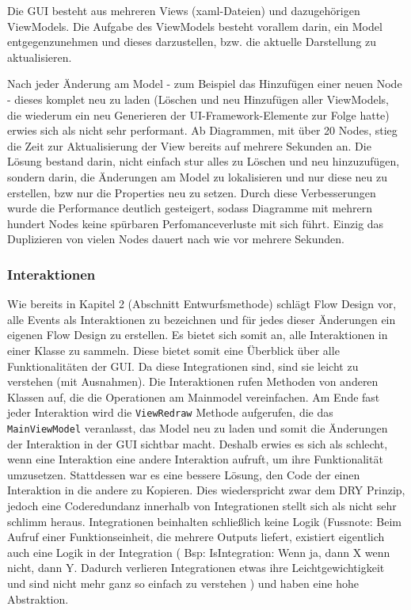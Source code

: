 Die GUI besteht aus mehreren Views (xaml-Dateien) und dazugehörigen ViewModels.
Die Aufgabe des ViewModels besteht vorallem darin, ein Model entgegenzunehmen und dieses
darzustellen, bzw. die aktuelle Darstellung zu aktualisieren.

Nach jeder Änderung am Model - zum Beispiel das Hinzufügen einer neuen
Node -  dieses komplet neu zu laden (Löschen und neu Hinzufügen aller
ViewModels, die wiederum ein neu Generieren der UI-Framework-Elemente zur
Folge hatte) erwies sich als nicht sehr performant. 
Ab Diagrammen, mit über 20 Nodes, stieg die Zeit zur Aktualisierung der View
bereits auf mehrere Sekunden an.
Die Lösung bestand darin, nicht einfach stur alles zu Löschen und neu
hinzuzufügen, sondern darin, die Änderungen am Model zu lokalisieren und nur
diese neu zu erstellen, bzw nur die Properties neu zu setzen. Durch
diese Verbesserungen wurde die Performance deutlich gesteigert, sodass
Diagramme mit mehrern hundert Nodes keine spürbaren Perfomanceverluste mit
sich führt. Einzig das Duplizieren von vielen Nodes dauert nach wie vor
mehrere Sekunden. 

\subsubsection{Interaktionen}
\label{sec:orgheadline26}
Wie bereits in Kapitel 2 (Abschnitt Entwurfsmethode) schlägt Flow Design
vor, alle Events als Interaktionen zu bezeichnen und für jedes dieser
Änderungen ein eigenen Flow Design zu erstellen. 
Es bietet sich somit an, alle Interaktionen in einer Klasse zu sammeln.
Diese bietet somit eine Überblick über alle Funktionalitäten der GUI.
Da diese Integrationen sind, sind sie leicht zu verstehen (mit Ausnahmen). Die
Interaktionen rufen Methoden von anderen Klassen auf, die die Operationen am
Mainmodel vereinfachen. Am Ende fast jeder Interaktion wird die \texttt{ViewRedraw}
Methode aufgerufen, die das \texttt{MainViewModel} veranlasst, das Model neu zu
laden und somit die Änderungen der Interaktion in der GUI sichtbar macht.
Deshalb erwies es sich als schlecht, wenn eine Interaktion eine andere
Interaktion aufruft, um ihre Funktionalität umzusetzen. 
Stattdessen war es eine bessere Lösung, den Code der einen Interaktion in
die andere zu Kopieren. Dies wiederspricht zwar dem DRY Prinzip, jedoch eine
Coderedundanz innerhalb von Integrationen stellt sich als nicht sehr schlimm
heraus. Integrationen beinhalten schließlich keine Logik (Fussnote: Beim
Aufruf einer Funktionseinheit, die mehrere Outputs liefert, existiert
eigentlich auch eine Logik in der Integration ( Bsp: IsIntegration: Wenn ja,
dann X wenn nicht, dann Y. Dadurch verlieren Integrationen etwas ihre
Leichtgewichtigkeit und sind nicht mehr ganz so einfach zu verstehen ) und haben eine hohe
Abstraktion.

